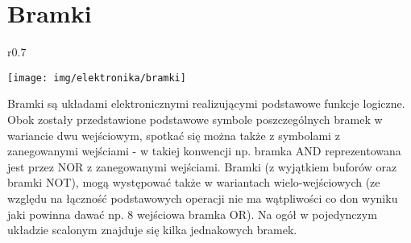 % 
% 
% 
% 

\section{Bramki}
\begin{wrapfigure}{r}{0.7\textwidth}
  \begin{center}
    \vspace{-40pt}
    \texttt{[image: img/elektronika/bramki]}
    \vspace{-20pt}
  \end{center}
\end{wrapfigure}

Bramki są układami elektronicznymi realizującymi podstawowe funkcje logiczne. Obok zostały przedstawione podstawowe symbole poszczególnych bramek w wariancie dwu wejściowym, spotkać się można także z symbolami z zanegowanymi wejściami - w takiej konwencji np. bramka AND reprezentowana jest przez NOR z zanegowanymi wejściami. Bramki (z wyjątkiem buforów oraz bramki NOT), mogą występować także w wariantach wielo-wejściowych (ze względu na łączność podstawowych operacji nie ma wątpliwości co don wyniku jaki powinna dawać np. 8 wejściowa bramka OR). Na ogół w pojedynczym układzie scalonym znajduje się kilka jednakowych bramek.

